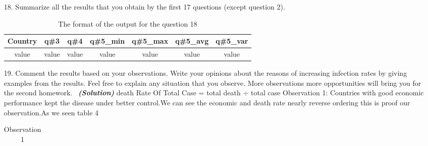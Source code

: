 \documentclass[a4 paper]{article}
\newcommand{\solution}{~\newline\textbf{\textit{(Solution)}} }
\newcommand{\0}{\mathbf{0}}
\begin{document}
\begin{itemize}
\begin{table}[ht]
\begin{tabular}{c c c c}
			\hline %
		\end{tabular}\label{table:nonlin}%
	\end{table}
	\item[18. ] Summarize all the results that you obtain by the first 17 questions (except question 2). 
	\begin{table}[ht]
		\caption{The format of the output for the question 18} %
		\centering  %
		\begin{tabular}{c c c c c c c}%
			\hline\hline       %
			Country & q\#3 & q\#4 & q\#5\_min &  q\#5\_max & q\#5\_avg &  q\#5\_var  \\ 
			[0.5ex]%
			\hline      %
			 value & value & value & value & value & value & value\\%

			\hline %
		\end{tabular}\label{table:nonlin}%
	\end{table}
	\item[19. ] Comment the results based on your observations. Write your opinions about the reasons of increasing infection rates by giving examples from the results. Feel free to explain any situation that you observe. More observations more opportunities will bring you for the second homework. 
	\solution
	\newline\newline
	\newline\newline\newline
    death Rate Of Total Case = total death $\div$  total case\newline\newline
	Observation 1:\newline
	Countries with good economic performance kept the disease under better control.We can see the economic and death rate nearly reverse ordering this is proof our observation.As we seen table 4\newline
	

	\begin{table}[!ht]
    \centering
    \caption{Observation 1}
    \label{tab:Ob1}
    \begin{tabular}{|c|c|c|}
    \hline


\end{tabular}
\end{table}
\end{itemize}
\end{document}
